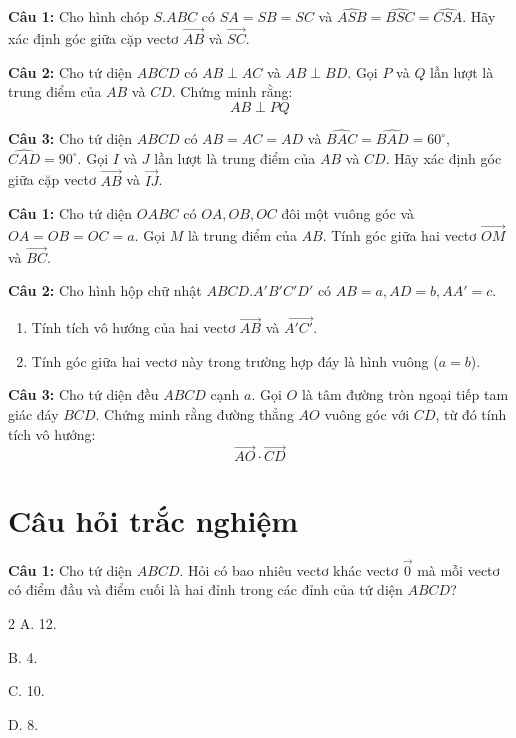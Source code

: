 \documentclass[12pt]{article}
\begin{document}
	\begin{btvang}[]
		\textbf{Câu 1:} Cho hình chóp $S.ABC$ có $SA = SB = SC$ và $\widehat{ASB} = \widehat{BSC} = \widehat{CSA}$. Hãy xác định góc giữa cặp vectơ $\overrightarrow{AB}$ và $\overrightarrow{SC}$.
		
		\vspace{0.2cm}
		\textbf{Câu 2:} Cho tứ diện $ABCD$ có $AB \perp AC$ và $AB \perp BD$. Gọi $P$ và $Q$ lần lượt là trung điểm của $AB$ và $CD$. Chứng minh rằng:
		$$ AB \perp PQ $$
		
		\vspace{0.2cm}
		\textbf{Câu 3:} Cho tứ diện $ABCD$ có $AB = AC = AD$ và $\widehat{BAC} = \widehat{BAD} = 60^\circ$, $\widehat{CAD} = 90^\circ$. Gọi $I$ và $J$ lần lượt là trung điểm của $AB$ và $CD$. Hãy xác định góc giữa cặp vectơ $\overrightarrow{AB}$ và $\overrightarrow{IJ}$.
	\end{btvang}
	
	\begin{btdo}[]
		\textbf{Câu 1:} Cho tứ diện $OABC$ có $OA, OB, OC$ đôi một vuông góc và $OA = OB = OC = a$. Gọi $M$ là trung điểm của $AB$. Tính góc giữa hai vectơ $\overrightarrow{OM}$ và $\overrightarrow{BC}$.
		
		\vspace{0.2cm}
		\textbf{Câu 2:} Cho hình hộp chữ nhật $ABCD.A'B'C'D'$ có $AB = a, AD = b, AA' = c$.
		\begin{enumerate}[label=\alph*)]
			\item Tính tích vô hướng của hai vectơ $\overrightarrow{AB}$ và $\overrightarrow{A'C'}$.
			\item Tính góc giữa hai vectơ này trong trường hợp đáy là hình vuông ($a = b$).
		\end{enumerate}
		
		\vspace{0.2cm}
		\textbf{Câu 3:} Cho tứ diện đều $ABCD$ cạnh $a$. Gọi $O$ là tâm đường tròn ngoại tiếp tam giác đáy $BCD$. Chứng minh rằng đường thẳng $AO$ vuông góc với $CD$, từ đó tính tích vô hướng:
		$$ \overrightarrow{AO} \cdot \overrightarrow{CD} $$
	\end{btdo}
	
	
	\section{Câu hỏi trắc nghiệm}
	
	\textbf{Câu 1:} Cho tứ diện $ABCD$. Hỏi có bao nhiêu vectơ khác vectơ $\vec{0}$ mà mỗi vectơ có điểm đầu và điểm cuối là hai đỉnh trong các đỉnh của tứ diện $ABCD$?
	\begin{multicols}{2}
		A. 12. \par
		B. 4. \par
		C. 10. \par
		D. 8.
	\end{multicols}
	
\end{document}
